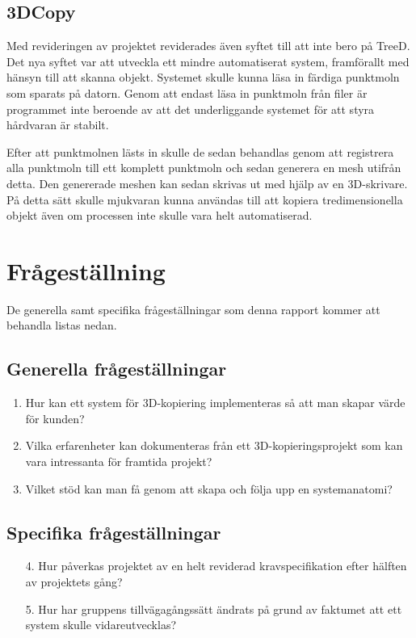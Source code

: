 \subsection{3DCopy}
Med revideringen av projektet reviderades även syftet till att inte bero på TreeD. Det nya syftet var att utveckla ett mindre automatiserat system, framförallt med hänsyn till att skanna objekt. Systemet skulle kunna läsa in färdiga punktmoln som sparats på datorn. Genom att endast läsa in punktmoln från filer är programmet inte beroende av att det underliggande systemet för att styra hårdvaran är stabilt.

Efter att punktmolnen lästs in skulle de sedan behandlas genom att registrera alla punktmoln till ett komplett punktmoln och sedan generera en mesh utifrån detta. Den genererade meshen kan sedan skrivas ut med hjälp av en 3D-skrivare. På detta sätt skulle mjukvaran kunna användas till att kopiera tredimensionella objekt även om processen inte skulle vara helt automatiserad.


\section{Frågeställning}
\label{sec:research-questions}
De generella samt specifika frågeställningar som denna rapport kommer att behandla listas nedan.

\subsection{Generella frågeställningar}

\begin{enumerate}
	\item Hur kan ett system för 3D-kopiering implementeras så att man skapar värde för kunden?
	\item Vilka erfarenheter kan dokumenteras från ett 3D-kopieringsprojekt som kan vara intressanta för framtida projekt?
	\item Vilket stöd kan man få genom att skapa och följa upp en systemanatomi?
\end{enumerate}
	
\subsection{Specifika frågeställningar}

\begin{enumerate}
	\item [4.] Hur påverkas projektet av en helt reviderad kravspecifikation efter hälften av projektets gång?
	\item [5.] Hur har gruppens tillvägagångssätt ändrats på grund av faktumet att ett system skulle vidareutvecklas? 
	
\end{enumerate}

